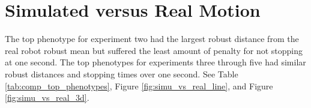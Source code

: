 

\newpage

\section{Simulated versus Real Motion}

The top phenotype for experiment two had the largest robust distance from the real robot robust mean but suffered the least amount of penalty for not stopping at one second. The top phenotypes for experiments three through five had similar robust distances and stopping times over one second. See Table \ref{tab:comp_top_phenotypes}, Figure \ref{fig:simu_vs_real_line}, and Figure \ref{fig:simu_vs_real_3d}. 

